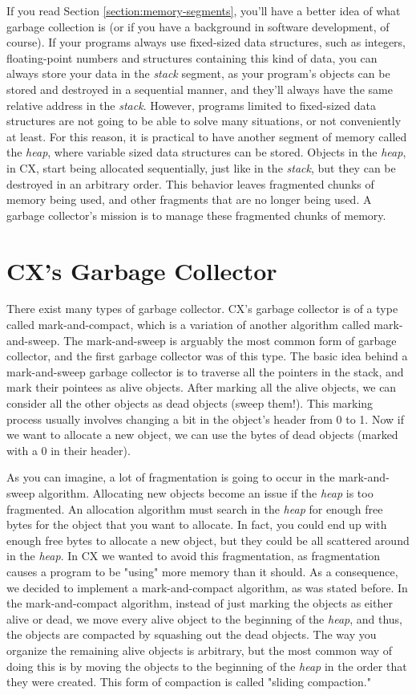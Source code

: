 \documentclass[11pt,fleqn,openany]{book} %
\begin{document}
If you read Section \ref{section:memory-segments}, you'll have a better idea of what garbage collection is (or if you have a background in software development, of course). If your programs always use fixed-sized data structures, such as integers, floating-point numbers and structures containing this kind of data, you can always store your data in the \emph{stack} segment, as your program's objects can be stored and destroyed in a sequential manner, and they'll always have the same relative address in the \emph{stack}. However, programs limited to fixed-sized data structures are not going to be able to solve many situations, or not conveniently at least. For this reason, it is practical to have another segment of memory called the \emph{heap}, where variable sized data structures can be stored. Objects in the \emph{heap}, in CX, start being allocated sequentially, just like in the \emph{stack}, but they can be destroyed in an arbitrary order. This behavior leaves fragmented chunks of memory being used, and other fragments that are no longer being used. A garbage collector's mission is to manage these fragmented chunks of memory.

\section{CX's Garbage Collector}

There exist many types of garbage collector. CX's garbage collector is of a type called mark-and-compact, which is a variation of another algorithm called mark-and-sweep. The mark-and-sweep is arguably the most common form of garbage collector, and the first garbage collector was of this type. The basic idea behind a mark-and-sweep garbage collector is to traverse all the pointers in the stack, and mark their pointees as alive objects. After marking all the alive objects, we can consider all the other objects as dead objects (sweep them!). This marking process usually involves changing a bit in the object's header from 0 to 1. Now if we want to allocate a new object, we can use the bytes of dead objects (marked with a 0 in their header).

As you can imagine, a lot of fragmentation is going to occur in the mark-and-sweep algorithm. Allocating new objects become an issue if the \emph{heap} is too fragmented. An allocation algorithm must search in the \emph{heap} for enough free bytes for the object that you want to allocate. In fact, you could end up with enough free bytes to allocate a new object, but they could be all scattered around in the \emph{heap}. In CX we wanted to avoid this fragmentation, as fragmentation causes a program to be "using" more memory than it should. As a consequence, we decided to implement a mark-and-compact algorithm, as was stated before. In the mark-and-compact algorithm, instead of just marking the objects as either alive or dead, we move every alive object to the beginning of the \emph{heap}, and thus, the objects are compacted by squashing out the dead objects. The way you organize the remaining alive objects is arbitrary, but the most common way of doing this is by moving the objects to the beginning of the \emph{heap} in the order that they were created. This form of compaction is called "sliding compaction."
\end{document}
